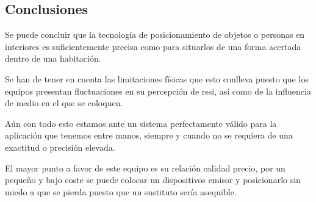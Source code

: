 \documentclass[paper=a4, fontsize=11pt,twoside]{scrartcl}
\begin{document}
    \subsection{Conclusiones}
        Se puede concluir que la tecnología de posicionamiento de objetos o personas en interiores es suficientemente precisa como para 
        situarlos de una forma acertada dentro de una habitación.
        
        Se han de tener en cuenta las limitaciones físicas que esto conlleva puesto
        que los equipos presentan fluctuaciones en su percepción de rssi, así como de la influencia de medio en el que se coloquen.

        Aún con todo esto estamos ante un sistema perfectamente válido para la aplicación que tenemos entre manos, siempre y cuando no se requiera de una
        exactitud o precisión elevada. 

        El mayor punto a favor de este equipo es su relación calidad precio, por un pequeño y bajo coste se puede colocar un dispositivos emisor y posicionarlo 
        sin miedo a que se pierda puesto que un sustituto sería asequible.
\end{document}
